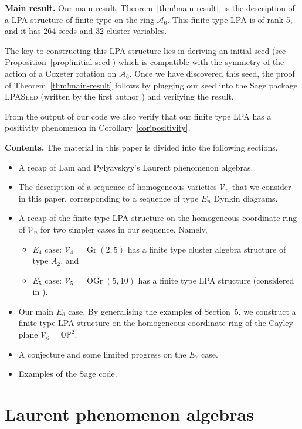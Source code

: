 \documentclass[10pt,a4paper]{amsart}
\numberwithin{equation}{section}
\theoremstyle{definition}
\DeclareMathOperator{\Gr}{Gr}
\DeclareMathOperator{\OGr}{OGr}
\begin{document}
{\bf Main result.}
Our main result, Theorem~\ref{thm!main-result}, is the description of a LPA structure of finite type on the ring $\mathcal A_6$. This finite type LPA is of rank 5, and it has 264 seeds and 32 cluster variables.

The key to constructing this LPA structure lies in deriving an initial seed (see Proposition~\ref{prop!initial-seed}) which is compatible with the symmetry of the action of a Coxeter rotation on $\mathcal A_6$. Once we have discovered this seed, the proof of Theorem~\ref{thm!main-result} follows by plugging our seed into the Sage package \textsc{LPASeed} (written by the first author \cite{sagecode}) and verifying the result.

From the output of our code we also verify that our finite type LPA has a positivity phenomenon in Corollary~\ref{cor!positivity}.

{\bf Contents.}
The material in this paper is divided into the following sections.
\begin{itemize}\itemsep=0pt
\item[\S2] A recap of Lam and Pylyavskyy's Laurent phenomenon algebras.
\item[\S3] The description of a sequence of homogeneous varieties $\mathcal V_n$ that we consider in this paper, corresponding to a sequence of type $E_n$ Dynkin diagrams.
\item[\S4] A recap of the finite type LPA structure on the homogeneous coordinate ring of $\mathcal V_n$ for two simpler cases in our sequence. Namely,
\begin{itemize}\itemsep=0pt
\item[{}]{$E_4$ case:} $\mathcal V_4=\Gr(2,5)$ has a finite type cluster algebra structure of type $A_2$, and
\item[{}]{$E_5$ case:} $\mathcal V_5=\OGr(5,10)$ has a finite type LPA structure (considered in \cite{duc}).
\end{itemize}
\item[\S5] Our main $E_6$ case. By generalising the examples of Section~5, we construct a finite type LPA structure on the homogeneous coordinate ring of the Cayley plane $\mathcal V_6=\mathbb{OP}^2$.
\item[\S6] A conjecture and some limited progress on the $E_7$ case.
\item[\S{A}] Examples of the Sage code.
\end{itemize}

\section{Laurent phenomenon algebras}
\end{document}
